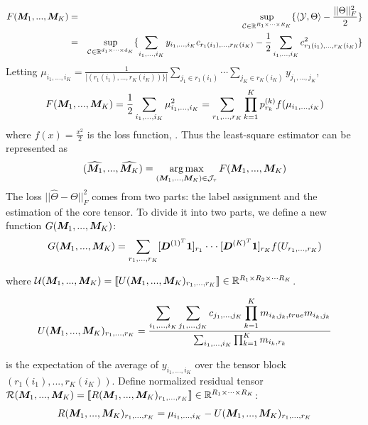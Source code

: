 \documentclass{article}
\begin{document}
\begin{appendices}
\begin{eqnarray*}
F(\boldsymbol{M}_1,...,\boldsymbol{M}_K) &=& \displaystyle\sup_{\mathcal{C}\in \mathbb{R}^{R_1\times\cdots\times R_K}}\{\langle \mathcal{Y},\Theta\rangle -\frac{||\Theta||_F^2}{2}\}\\
&=& \displaystyle\sup_{\mathcal{C}\in\mathbb{R}^{d_1\times\cdots\times d_K}}\{\displaystyle\sum_{i_1,...,i_K}y_{i_1,...,i_K}c_{r_1(i_1),...,r_K(i_K)}-\frac{1}{2}\sum_{i_1,...,i_K}c_{r_1(i_1),...,r_K(i_K)}^2\}\\
\end{eqnarray*}
Letting  $\mu_{i_1,...,i_K}=\displaystyle \frac{1}{| ( r_1(i_1),...,r_K(i_K))\}|} \sum_{j_1\in r_1(i_1)}\cdots \sum_{j_K\in r_K(i_K)}y_{j_1,...,j_K}$,
\begin{equation*}
F(\boldsymbol{M}_1,...,\boldsymbol{M}_K)  = \frac{1}{2} \sum_{i_1,...,i_K}\mu_{i_1,...,i_K}^2 \\
= \sum_{r_1,...,r_K}\prod_{k=1}^{K}p^{(k)}_{r_k}f(\mu_{i_1,...,i_K})
\end{equation*}
where $f(x)=\frac{x^2}{2}$ is the loss function, . 
Thus the least-square estimator can be represented as 
\begin{equation}
    (\widehat{\boldsymbol{M}_1},...,\widehat{\boldsymbol{M}_K}) = \displaystyle\operatorname*{arg\,max}_{(\boldsymbol{M}_1,...,\boldsymbol{M}_K)\in \mathcal{J}_\tau}F(\boldsymbol{M}_1,...,\boldsymbol{M}_K)
\end{equation}
The loss $||\hat{\Theta}-\Theta||^2_F$ comes from two parts: the label assignment and the estimation of the core tensor. To divide it into two parts, we define a new function $G(\boldsymbol{M}_1,...,\boldsymbol{M}_K)$:
\begin{equation*}
G(\boldsymbol{M}_1,...,\boldsymbol{M}_K) = \displaystyle\sum_{r_1,...,r_K}[\boldsymbol{D}^{(1)^T}\boldsymbol{1}]_{r_1}\cdot\cdot\cdot[\boldsymbol{D}^{(K)^T}\boldsymbol{1}]_{r_K}f(U_{r_1,...,r_K})
\end{equation*}

where $\mathcal{U} (\boldsymbol{M}_1,...,\boldsymbol{M}_K) = \llbracket U(\boldsymbol{M}_1,...,\boldsymbol{M}_K)_{r_1,...,r_K} \rrbracket\in \mathbb{R}^{R_1\times R_2\times\cdot\cdot\cdot R_K}$.

\begin{equation*}
    U(\boldsymbol{M}_1,...,\boldsymbol{M}_K)_{r_1,...,r_K} = \frac{\displaystyle\sum_{i_1,...,i_K}\sum_{j_1,...,j_K}c_{j_1,...,j_K}\prod_{k=1}^K m_{i_k,j_k,true}m_{i_k,j_k}}{\sum_{i_1,...,i_K}\prod_{k=1}^K m_{i_k,r_k}}
\end{equation*}

is the expectation of the average of $y_{i_1,...,i_K}$ over the tensor block $(r_1(i_1),...,r_K(i_K))$.
Define normalized residual tensor $\mathcal{R}(\boldsymbol{M}_1,...,\boldsymbol{M}_K) = \llbracket  R(\boldsymbol{M}_1,...,\boldsymbol{M}_K)_{r_1,...,r_K}  \rrbracket \in \mathbb{R}^{R_1\times\cdots\times R_K}$:
\begin{equation*}
    R(\boldsymbol{M}_1,...,\boldsymbol{M}_K)_{r_1,...,r_K}=\mu_{i_1,...,i_K}-U(\boldsymbol{M}_1,...,\boldsymbol{M}_K)_{r_1,...,r_K}
\end{equation*}


\end{appendices}
\end{document}
